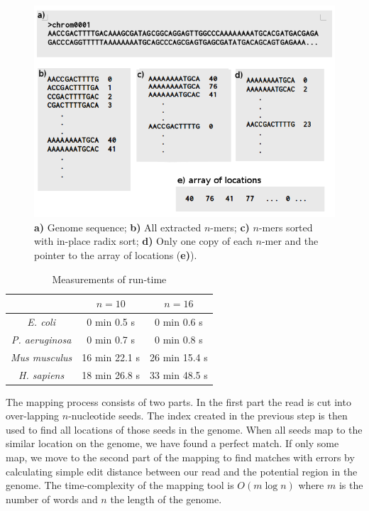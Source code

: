 \documentclass[portrait, a0paper, margin=7cm]{baposter}
\begin{document}
\begin{poster}
{\begin{figure}[H]
\begin{center}
\includegraphics[scale=0.35]{radix}
\caption{\textbf{a)} Genome sequence; \textbf{b)} All extracted $n$-mers; \textbf{c)} $n$-mers sorted with in-place radix sort; \textbf{d)} Only one copy of each $n$-mer and the pointer to the array of locations (\textbf{e)}).}
\end{center}
\end{figure}

\begin{table}[H]
\begin{center}
\caption {Measurements of run-time} 

\begin{tabular}{ccc}
& $n = 10$ & $n = 16$\\
\hline
\textit{E. coli} & 0 min 0.5 s & 0 min 0.6 s\\
\hline
\textit{P. aeruginosa} & 0 min 0.7 s & 0 min 0.8 s\\
\hline
\textit{Mus musculus} & 16 min 22.1 s & 26 min 15.4 s\\
\hline
\textit{H. sapiens} & 18 min 26.8 s & 33 min 48.5 s\\
\end {tabular}
\end{center}
\end{table}

}



 {
The mapping process consists of two parts. In the first part the read is cut into over-lapping $n$-nucleotide seeds. The index created in the previous step is then used to find all locations of those seeds in the genome. When all seeds map to the similar location on the genome, we have found a perfect match. If only some map, we move to the second part of the mapping to find matches with errors by calculating simple edit distance between our read and the potential region in the genome. The time-complexity of the mapping tool is $O(m\log n)$ where $m$ is the number of words and $n$ the length of the genome.

}
\end{poster}
\end{document}
